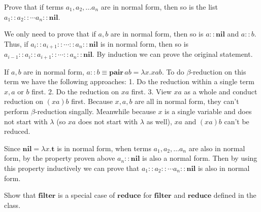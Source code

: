 \documentclass{homework}
\begin{document}
\begin{problem}
  Prove that if terms $a_{1}, a_{2}, \ldots a_{n}$ are in normal form, then so
  is the list $a_{1} :: a_{2} :: \cdots a_{n} :: \mathbf{nil}$.
\end{problem}

\begin{solution}
We only need to prove that if $a,b$ are in normal form, then so is $a::\mathbf{nil}$ and $a::b$. Thus, if $a_i::a_{i+1}::\cdots::a_n::\mathbf{nil}$ is in normal form, then so is $a_{i-1}::a_i::a_{i+1}::\cdots::a_n::\mathbf{nil}$. By induction we can prove the original statement.

If $a,b$ are in normal form, $a::b\equiv\mathbf{pair}\,ab=\lambda x.xab$. To do $\beta$-reduction on this term we have the following approaches: 1. Do the reduction within a single term $x,a$ or $b$ first. 2. Do the reduction on $xa$ first. 3. View $xa$ as a whole and conduct reduction on $(xa)b$ first. Because $x,a,b$ are all in normal form, they can't perform $\beta$-reduction singally. Meanwhile because $x$ is a single variable and does not start with $\lambda$ (so $xa$ does not start with $\lambda$ as well), $xa$ and $(xa)b$ can't be reduced.

Since $\mathbf{nil}=\lambda x.\mathbf{t}$ is in normal form, when terms $a_{1}, a_{2}, \ldots a_{n}$ are also in normal form, by the property proven above $a_n::\mathbf{nil}$ is also a normal form. Then by using this property inductively we can prove that $a_{1} :: a_{2} :: \cdots a_{n} :: \mathbf{nil}$ is also in normal form.
\end{solution}

\begin{problem}
  Show that $\mathbf{filter}$ is a special case of $\mathbf{reduce}$ for
  $\mathbf{filter}$ and $\mathbf{reduce}$ defined in the class.
\end{problem}
\end{document}
